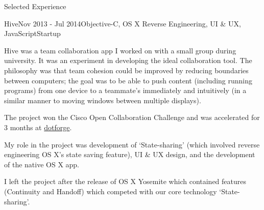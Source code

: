 \documentclass{resume} %
\begin{document}
\begin{rSection}{Selected Experience}
\begin{rSubsection}{Hive}{Nov 2013 - Jul 2014}{Objective-C, OS X Reverse Engineering,  UI \& UX, JavaScript}{Startup}
\item Hive was a team collaboration app I worked on with a small group during university. It was an experiment in developing the ideal collaboration tool. The philosophy was that team cohesion could be improved by reducing boundaries between computers; the goal was to be able to push content (including running programs) from one device to a teammate's immediately and intuitively (in a similar manner to moving windows between multiple displays).
\item The project won the Cisco Open Collaboration Challenge and was accelerated for 3 months at \href{http://www.dotforge.com/}{dotforge}.
\item My role in the project was development of `State-sharing' (which involved reverse engineering OS X's state saving feature), UI \& UX design, and the development of the native OS X app.
\item I left the project after the release of OS X Yosemite which contained features (Continuity and Handoff) which competed with our core technology `State-sharing'.
\end{rSubsection}


\end{rSection}



\end{document}
